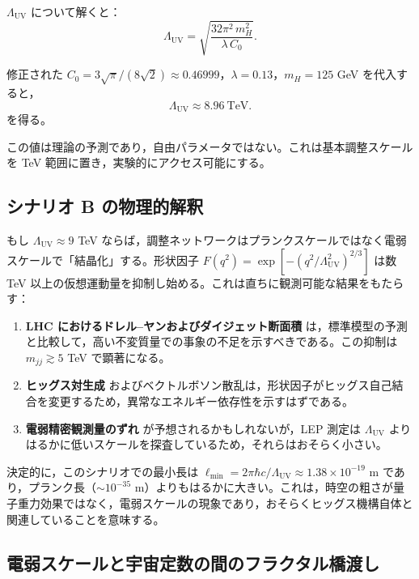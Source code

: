 \documentclass[11pt,a4paper]{article}
\newcommand{\Lmin}{\ell_{\min}}
\newcommand{\LUV}{\Lambda_{\mathrm{UV}}}
\theoremstyle{remark}
\begin{document}
	\(\LUV\) について解くと：
	\begin{equation}
		\LUV = \sqrt{\frac{32\pi^2\, m_H^2}{\lambda\, C_0}}.
		\label{eq:LUV_solve}
	\end{equation}
	
	修正された \(C_0 = 3\sqrt{\pi}/(8\sqrt{2}) \approx 0.46999\)，\(\lambda = 0.13\)，\(m_H = 125\) GeV を代入すると，
	\begin{equation}
		\boxed{\LUV \approx 8.96\ \mathrm{TeV}}.
		\label{eq:LUV_TeV}
	\end{equation}
	を得る。
	
	この値は理論の予測であり，自由パラメータではない。これは基本調整スケールを TeV 範囲に置き，実験的にアクセス可能にする。
	
	\subsection{シナリオ B の物理的解釈}
	
	もし \(\LUV \approx 9\) TeV ならば，調整ネットワークはプランクスケールではなく電弱スケールで「結晶化」する。形状因子 \(F(q^2) = \exp[-(q^2/\LUV^2)^{2/3}]\) は数 TeV 以上の仮想運動量を抑制し始める。これは直ちに観測可能な結果をもたらす：
	
	\begin{enumerate}[label=(\arabic*)]
		\item \textbf{LHC におけるドレル–ヤンおよびダイジェット断面積} は，標準模型の予測と比較して，高い不変質量での事象の不足を示すべきである。この抑制は \(m_{jj} \gtrsim 5\) TeV で顕著になる。
		\item \textbf{ヒッグス対生成} およびベクトルボソン散乱は，形状因子がヒッグス自己結合を変更するため，異常なエネルギー依存性を示すはずである。
		\item \textbf{電弱精密観測量のずれ} が予想されるかもしれないが，LEP 測定は \(\LUV\) よりはるかに低いスケールを探査しているため，それらはおそらく小さい。
	\end{enumerate}
	
	決定的に，このシナリオでの最小長は \(\Lmin = 2\pi\hbar c/\LUV \approx 1.38\times 10^{-19}\) m であり，プランク長（\(\sim 10^{-35}\) m）よりもはるかに大きい。これは，時空の粗さが量子重力効果ではなく，電弱スケールの現象であり，おそらくヒッグス機構自体と関連していることを意味する。
	
	\subsection{電弱スケールと宇宙定数の間のフラクタル橋渡し}
	\label{subsec:bridge}
	
\end{document}

